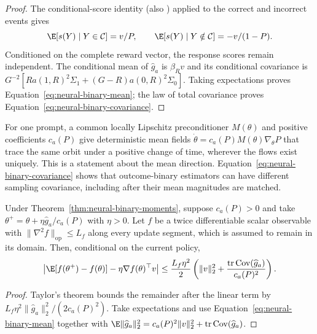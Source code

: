 \begin{proof}
\enforcehalffinalproseline
The conditional-score identity
\citep[Theorem~1]{tajwar2026maxrl} (also
\citealp[Lemma~B.1]{avspo2026}) applied to the correct and incorrect events gives
\[
 \E[s(Y)\mid Y\in\mathcal C]=v/P,
 \qquad
 \E[s(Y)\mid Y\notin\mathcal C]=-v/(1-P).
\]
Conditioned on the complete reward vector, the response scores remain
independent. The conditional mean of $\widehat g_a$ is $\beta_Rv$ and
its conditional covariance is
$G^{-2}[R a(1,R)^2\Sigma_1+(G-R)a(0,R)^2\Sigma_0]$.
Taking expectations proves Equation~\eqref{eq:neural-binary-mean}; the law
of total covariance proves Equation~\eqref{eq:neural-binary-covariance}.
\end{proof}

For one prompt, a common locally Lipschitz preconditioner $M(\theta)$ and
positive coefficients $c_a(P)$ give deterministic mean fields
$\dot\theta=c_a(P)M(\theta)\nabla_\theta P$ that trace the same orbit
under a positive change of time, wherever the flows exist uniquely.
This is a statement about the mean direction. Equation~\eqref{eq:neural-binary-covariance}
shows that outcome-binary estimators can have different sampling covariance,
including after their mean magnitudes are matched.

\begin{corollary}
\enforcehalffinalproseline
\label{cor:neural-binary-finite-step}
Under Theorem~\ref{thm:neural-binary-moments}, suppose $c_a(P)>0$ and take
$\theta^+=\theta+\eta\widehat g_a/c_a(P)$ with $\eta>0$. Let $f$ be a
twice differentiable scalar observable with
$\|\nabla^2f\|_{\mathrm{op}}\le L_f$ along every update segment, which
is assumed to remain in its domain. Then, conditional on the current policy,
\begin{equation}
 \left|\E[f(\theta^+)-f(\theta)]
       -\eta\nabla f(\theta)^\top v\right|
 \le\frac{L_f\eta^2}{2}
 \left(\|v\|_2^2+
       \frac{\operatorname{tr}\operatorname{Cov}(\widehat g_a)}{c_a(P)^2}
 \right).
 \label{eq:neural-binary-finite-step}
\end{equation}
\end{corollary}

\begin{proof}
\enforcehalffinalproseline
Taylor's theorem bounds the remainder after the linear term by
$L_f\eta^2\|\widehat g_a\|_2^2/(2c_a(P)^2)$. Take expectations and use
Equation~\eqref{eq:neural-binary-mean} together with
$\E\|\widehat g_a\|_2^2
=c_a(P)^2\|v\|_2^2+\operatorname{tr}\operatorname{Cov}(\widehat g_a)$.
\end{proof}

